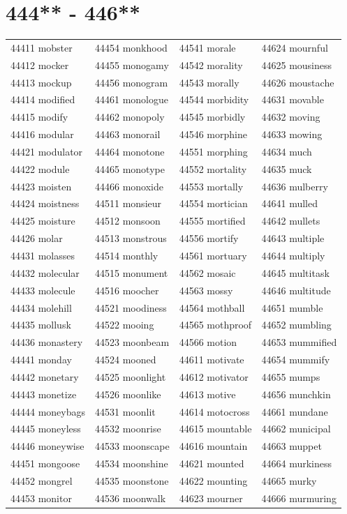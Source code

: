 \documentclass[10pt, oneside]{book}
\begin{document}
\begin{table}
	\centering
	\section*{444** - 446**}
	\begin{tabular}{l l l l}
44411 mobster &44454 monkhood &44541 morale &44624 mournful\\
44412 mocker &44455 monogamy &44542 morality &44625 mousiness\\
44413 mockup &44456 monogram &44543 morally &44626 moustache\\
44414 modified &44461 monologue &44544 morbidity &44631 movable\\
44415 modify &44462 monopoly &44545 morbidly &44632 moving\\
44416 modular &44463 monorail &44546 morphine &44633 mowing\\
44421 modulator &44464 monotone &44551 morphing &44634 much\\
44422 module &44465 monotype &44552 mortality &44635 muck\\
44423 moisten &44466 monoxide &44553 mortally &44636 mulberry\\
44424 moistness &44511 monsieur &44554 mortician &44641 mulled\\
44425 moisture &44512 monsoon &44555 mortified &44642 mullets\\
44426 molar &44513 monstrous &44556 mortify &44643 multiple\\
44431 molasses &44514 monthly &44561 mortuary &44644 multiply\\
44432 molecular &44515 monument &44562 mosaic &44645 multitask\\
44433 molecule &44516 moocher &44563 mossy &44646 multitude\\
44434 molehill &44521 moodiness &44564 mothball &44651 mumble\\
44435 mollusk &44522 mooing &44565 mothproof &44652 mumbling\\
44436 monastery &44523 moonbeam &44566 motion &44653 mummified\\
44441 monday &44524 mooned &44611 motivate &44654 mummify\\
44442 monetary &44525 moonlight &44612 motivator &44655 mumps\\
44443 monetize &44526 moonlike &44613 motive &44656 munchkin\\
44444 moneybags &44531 moonlit &44614 motocross &44661 mundane\\
44445 moneyless &44532 moonrise &44615 mountable &44662 municipal\\
44446 moneywise &44533 moonscape &44616 mountain &44663 muppet\\
44451 mongoose &44534 moonshine &44621 mounted &44664 murkiness\\
44452 mongrel &44535 moonstone &44622 mounting &44665 murky\\
44453 monitor &44536 moonwalk &44623 mourner &44666 murmuring\\
	\end{tabular}
 \end{table}
\clearpage
\end{document}
